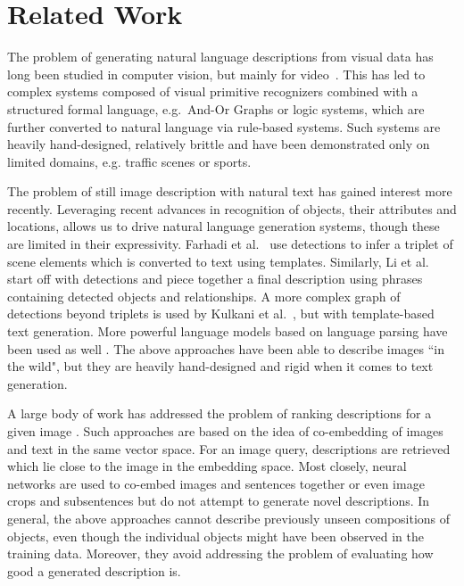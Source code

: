 \section{Related Work}
\label{sec:related}

The problem of generating natural language descriptions from visual
data has long been studied in computer vision, but mainly for
video~\cite{gerber1996knowledge,yao2010i2t}. This has led to complex
systems composed of visual primitive recognizers combined with a structured
formal language, e.g.~And-Or Graphs or logic systems, which are
further converted to natural language via rule-based systems. Such
systems are heavily hand-designed, relatively brittle and have been
demonstrated only on limited domains, e.g. traffic scenes or sports.

The problem of still image description with natural text has gained
interest more recently. Leveraging recent advances in recognition of
objects, their attributes and locations, allows us to drive natural language
generation systems, though these are limited in their
expressivity. Farhadi et al.~\cite{farhadi2010every} use detections to
infer a triplet of scene elements which is converted to text using
templates. Similarly, Li et al.~\cite{li2011composing} start off with
detections and piece together a final description using phrases containing
detected objects and relationships. A more complex graph of detections
beyond triplets is used by Kulkani et
al.~\cite{kulkarni2011baby}, but with template-based text generation.
More powerful language models based on language parsing
have been used as well
\cite{mitchell2012midge,aker2010generating,kuznetsova2012collective,kuznetsova2014treetalk,elliott2013image}. The
above approaches have been able to describe images ``in the wild",
but they are heavily hand-designed and rigid when it comes to text
generation.

A large body of work has addressed the problem of ranking descriptions
for a given image
\cite{hodosh2013framing,gong2014improving,ordonez2011im2text}. Such
approaches are based on the idea of co-embedding of images and text in
the same vector space. For an image query, descriptions are retrieved
which lie close to the image in the embedding space. Most closely, neural networks are used to co-embed
images and sentences together \cite{socher2014grounded} or even image crops and subsentences \cite{karpathy2014deep} but do not attempt to generate novel
descriptions. In general, the above approaches cannot describe previously unseen
compositions of objects, even though the individual objects might have been
observed in the training data. Moreover, they avoid addressing the
problem of evaluating how good a generated description is.

